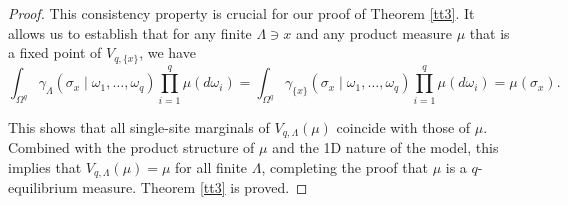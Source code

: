 \documentclass[10pt,a4paper]{amsart}
\begin{document}
\begin{proof}
This consistency property is crucial for our proof of Theorem \ref{tt3}. 
It allows us to establish that for any finite $\Lambda \ni x$ and any product 
measure $\mu$ that is a fixed point of $V_{q,\{x\}}$, we have
$$
\int_{\Omega^q} \gamma_\Lambda(\sigma_x \mid \omega_1, \dots, \omega_q) \prod_{i=1}^q \mu(d\omega_i) = \int_{\Omega^q} \gamma_{\{x\}}(\sigma_x \mid \omega_1, \dots, \omega_q) \prod_{i=1}^q \mu(d\omega_i) = \mu(\sigma_x).
$$

This shows that all single-site marginals of $V_{q,\Lambda}(\mu)$ coincide with those of $\mu$. Combined with the product structure of $\mu$ and the 1D nature of the model, this implies that $V_{q,\Lambda}(\mu) = \mu$ for all finite $\Lambda$, completing the proof that $\mu$ is a $q$-equilibrium measure. Theorem \ref{tt3} is proved.
\end{proof}
\end{document}
